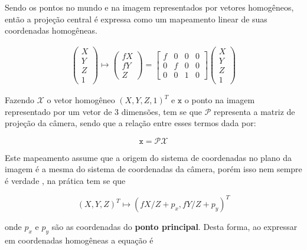 {Sendo os pontos no mundo e na imagem representados por vetores homogêneos, então a projeção central é expressa como um mapeamento linear de suas coordenadas homogêneas.

\begin{align}
\left(\begin{array}{c}
X\\
Y\\
Z\\
1
\end{array}\right) \mapsto
\left(\begin{array}{c}
fX\\
fY\\
Z
\end{array}\right) =
\left[\begin{array}{cccc}
f & 0 & 0 & 0\\
0 & f & 0 & 0\\
0 & 0 & 1 & 0
\end{array}\right]
\left(\begin{array}{c}
X\\
Y\\
Z\\
1
\end{array}\right)
\label{eq:3d_vetHomogeneo1}
\end{align}

Fazendo $\mathcal{X}$ o vetor homogêneo $(X,Y,Z,1)^T$ e $\mathtt{x}$ o ponto na imagem representado por um vetor de 3 dimensões, tem se que $\bm{\mathcal{P}}$ representa a matriz de projeção da câmera, sendo que a relação entre esses termos dada por:

\begin{equation}
\mathtt{x} = \bm{\mathcal{P}}\mathcal{X}
\label{eq:3d_Pmatriz}
\end{equation}

Este mapeamento assume que a origem do sistema de coordenadas no plano da imagem é a mesma do sistema de coordenadas da câmera, porém isso nem sempre é verdade \cite{hartley2003multiple}, na prática tem se que

\begin{equation}
(X,Y,Z)^T \mapsto (fX/Z + p_x,fY/Z + p_y)^T
\label{eq:3d_mapForaCentro}
\end{equation}


onde $p_x$ e $p_y$ são as coordenadas do \textbf{ponto principal}. Desta forma, ao expressar em coordenadas homogêneas a equação é

}
